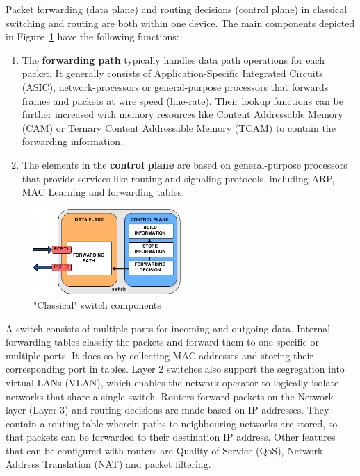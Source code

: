 Packet forwarding (data plane) and routing decisions (control plane) in classical switching and routing are both within one device. The main components depicted in Figure~\ref{fig:switch} have the following functions:
\begin{enumerate}
\item The \textbf{forwarding path} typically handles data path operations for each packet. It generally consists of Application-Specific Integrated Circuits (ASIC), network-processors or general-purpose processors that forwards frames and packets at wire speed (line-rate). Their lookup functions can be further increased with memory resources like Content Addressable Memory (CAM) or Ternary Content Addressable Memory (TCAM) to contain the forwarding information.
\item The elements in the \textbf{control plane} are based on general-purpose processors that provide services like routing and signaling protocols, including ARP, MAC Learning and forwarding tables.
\end{enumerate}

\begin{figure}[H]
\centering

\includegraphics[width=0.5\textwidth]{images/fundamentals/switch_components}

\caption{"Classical" switch components}\label{fig:switch}
\end{figure}

A switch consists of multiple ports for incoming and outgoing data. Internal forwarding tables classify the packets and forward them to one specific or multiple ports. It does so by collecting MAC addresses and storing their corresponding port in tables. Layer 2 switches also support the segregation into virtual LANs (VLAN), which enables the network operator to logically isolate networks that share a single switch.
\newpage
Routers forward packets on the Network layer (Layer 3) and routing-decisions are made based on IP addresses. They contain a routing table wherein paths to neighbouring networks are stored, so that packets can be forwarded to their destination IP address. Other features that can be configured with routers are Quality of Service (QoS), Network Address Translation (NAT) and packet filtering.

